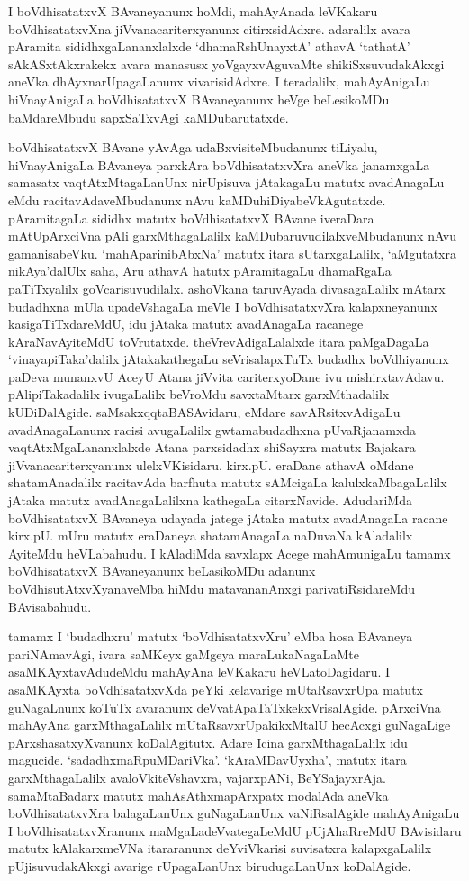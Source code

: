 I boVdhisatatxvX BAvaneyanunx hoMdi, mahAyAnada leVKakaru boVdhisatatxvXna jiVvanacariterxyanunx citirxsidAdxre. adaralilx avara pAramita sididhxgaLananxlalxde `dhamaR\break\-shUnayxtA' athavA `tathatA' sAkASxtAkxrakekx avara manasusx yoVgayxvAguvaMte shikiSxsu\-vudakAkxgi aneVka dhAyxnarUpagaLanunx vivarisidAdxre. I teradalilx, mahAyAnigaLu hiVnayAnigaLa boVdhisatatxvX BAvaneyanunx heVge beLesikoMDu baMdareMbudu sapxSaTxvAgi kaMDubarutatxde.

boVdhisatatxvX BAvane yAvAga udaBxvisiteMbudanunx tiLiyalu, hiVnayAnigaLa BAvaneya parxkAra boVdhisatatxvXra aneVka janamxgaLa samasatx vaqtAtxMtagaLanUnx nirUpisuva jAtakagaLu matutx avadAnagaLu eMdu racitavAdaveMbudanunx nAvu kaMDuhiDiya\break\-beVkAgutatxde. pAramitagaLa sididhx matutx boVdhisatatxvX BAvane iveraDara mAtU\break pArxciVna pAli garxMthagaLalilx kaMDubaruvudilalxveMbudanunx nAvu gamanisabeVku. `mahA\-parinibAbxNa' matutx itara sUtarxgaLalilx, `aMgutatxra nikAya'dalUlx saha, Aru athavA hatutx pAramitagaLu dhamaRgaLa paTiTxyalilx goVcarisuvudilalx. ashoVkana taruvAyada divasagaLalilx mAtarx budadhxna mUla upadeVshagaLa meVle I boVdhisatatxvXra kalapxneyanunx kasigaTiTxdareMdU, idu jAtaka matutx avadAnagaLa racanege kAraNavAyiteMdU toVrutatxde. theVrevAdigaLalalxde itara paMgaDagaLa `vinayapiTaka'dalilx jAtakakathegaLu seVrisalapxTuTx budadhx boVdhiyanunx paDeva munanxvU AceyU Atana jiVvita cariterxyoDane ivu mishirxtavAdavu. pAlipiTakadalilx ivugaLalilx beVroMdu savxtaMtarx garxMthadalilx kUDiDalAgide. saMsakxqqtaBASAvidaru, eMdare savARsitxvAdigaLu avadAnagaLanunx racisi avugaLalilx gwtamabudadhxna pUvaRjanamxda vaqtAtxMgaLananxlalxde Atana parxsidadhx shiSayxra matutx Bajakara jiVvanacariterxyanunx ulelxVKisidaru. kirx.pU. eraDane athavA oMdane shatamAnadalilx racitavAda barfhuta matutx sAMcigaLa kalulxkaMbagaLalilx jAtaka matutx avadAnagaLalilxna kathegaLa citarxNavide. AdudariMda boVdhisatatxvX BAvaneya udayada jatege jAtaka matutx avadAnagaLa racane kirx.pU. mUru matutx eraDaneya shatamAnagaLa naDuvaNa kAladalilx AyiteMdu heVLabahudu. I kAladiMda savxlapx Acege mahAmunigaLu tamamx boVdhisatatxvX BAvaneyanunx beLasikoMDu adanunx boVdhisutAtxvXyanaveMba hiMdu matavananAnxgi parivatiRsidareMdu BAvisabahudu.

tamamx I `budadhxru' matutx `boVdhisatatxvXru' eMba hosa BAvaneya pariNAma\-vAgi, ivara saMKeyx gaMgeya maraLukaNagaLaMte asaMKAyxtavAdudeMdu mahAyAna leVKakaru heVLatoDagidaru. I asaMKAyxta boVdhisatatxvXda peYki kelavarige mUtaRsavxrUpa matutx guNagaLnunx koTuTx avaranunx deVvatApaTaTxkekxVrisalAgide. pArxciVna mahAyAna garxMthagaLalilx mUtaRsavxrUpakikxMtalU hecAcxgi guNagaLige pArxshasatxyXvanunx koDalAgitutx. Adare Icina garxMthagaLalilx idu magucide. `sadadhxmaRpuMDariVka'. `kAraMDavUyxha', matutx itara garxMthagaLalilx avaloVkiteVshavxra, vajarxpANi, BeYSajayxrAja. samaMtaBadarx matutx mahAsAthxmapArxpatx modalAda aneVka boVdhisatatxvXra balagaLanUnx guNagaLanUnx vaNiRsalAgide mahAyAnigaLu I boVdhisatatxvXranunx maMgaLadeVvategaLeMdU pUjAhaRreMdU BAvisidaru matutx kAlakarxmeVNa itararanunx deYviVkarisi suvisatxra kalapxgaLalilx pUjisuvudakAkxgi avarige rUpagaLanUnx birudugaLanUnx koDalAgide.

